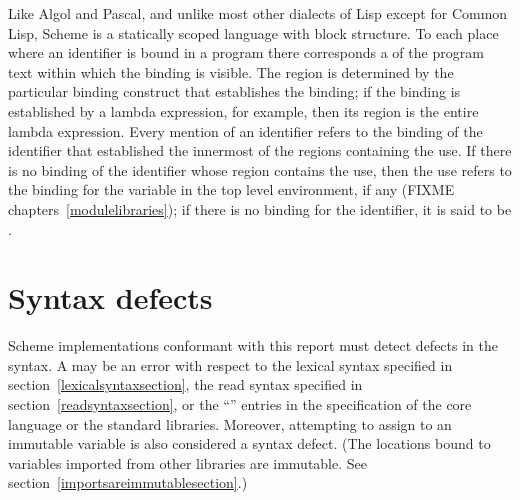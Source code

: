 \vest Like Algol and Pascal, and unlike most other dialects of Lisp
except for Common Lisp, Scheme is a statically scoped language with
block structure.  To each place where an identifier is bound in a program
there corresponds a  of the program text within which
the binding is visible.  The region is determined by the particular
binding construct that establishes the binding; if the binding is
established by a {\cf lambda} expression, for example, then its region
is the entire {\cf lambda} expression.  Every mention of an identifier
refers to the binding of the identifier that established the
innermost of the regions containing the use.  If there is no binding of
the identifier whose region contains the use, then the use refers to the
binding for the variable in the top level environment, if any
(FIXME chapters~\ref{modulelibraries}); if there is no
binding for the identifier,
it is said to be .




\section{Syntax defects}

Scheme implementations conformant with this report must detect
defects in the syntax.  A  may be an error with
respect to the lexical syntax specified in
section~\ref{lexicalsyntaxsection}, the read syntax specified in
section~\ref{readsyntaxsection}, or the ``\exprtype'' entries in the
specification of the core language or the standard libraries.
Moreover, attempting to assign to an immutable variable is also
considered a syntax defect.  (The locations bound to variables
imported from other libraries are immutable.  See
section~\ref{importsareimmutablesection}.)

